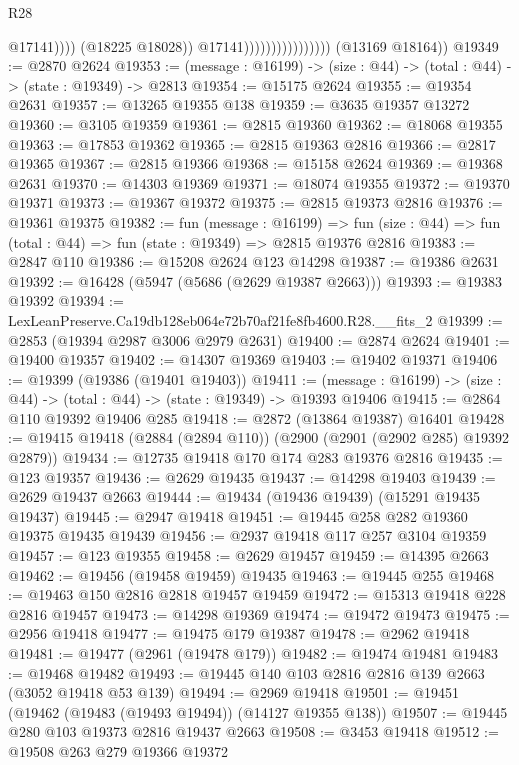 \begin{lexlean}{R28}
\begin{coremodule}
                                                @17141))))
                                        (@18225 @18028))
                                      @17141))))))))))))))))
      (@13169 @18164))
@19349 := @2870 @2624
@19353 := (message : @16199) -> (size : @44) -> (total : @44) -> (state : @19349) -> @2813
@19354 := @15175 @2624
@19355 := @19354 @2631
@19357 := @13265 @19355 @138
@19359 := @3635 @19357 @13272
@19360 := @3105 @19359
@19361 := @2815 @19360
@19362 := @18068 @19355
@19363 := @17853 @19362
@19365 := @2815 @19363 @2816
@19366 := @2817 @19365
@19367 := @2815 @19366
@19368 := @15158 @2624
@19369 := @19368 @2631
@19370 := @14303 @19369
@19371 := @18074 @19355
@19372 := @19370 @19371
@19373 := @19367 @19372
@19375 := @2815 @19373 @2816
@19376 := @19361 @19375
@19382 := fun (message : @16199) =>
  fun (size : @44) => fun (total : @44) => fun (state : @19349) => @2815 @19376 @2816
@19383 := @2847 @110
@19386 := @15208 @2624 @123 @14298
@19387 := @19386 @2631
@19392 := @16428 (@5947 (@5686 (@2629 @19387 @2663)))
@19393 := @19383 @19392
@19394 := LexLeanPreserve.Ca19db128eb064e72b70af21fe8fb4600.R28.__fits_2
@19399 := @2853 (@19394 @2987 @3006 @2979 @2631)
@19400 := @2874 @2624
@19401 := @19400 @19357
@19402 := @14307 @19369
@19403 := @19402 @19371
@19406 := @19399 (@19386 (@19401 @19403))
@19411 := (message : @16199) -> (size : @44) -> (total : @44) -> (state : @19349) -> @19393 @19406
@19415 := @2864 @110 @19392 @19406 @285
@19418 := @2872 (@13864 @19387) @16401
@19428 := @19415 @19418 (@2884 (@2894 @110)) (@2900 (@2901 (@2902 @285) @19392 @2879))
@19434 := @12735 @19418 @170 @174 @283 @19376 @2816
@19435 := @123 @19357
@19436 := @2629 @19435
@19437 := @14298 @19403
@19439 := @2629 @19437 @2663
@19444 := @19434 (@19436 @19439) (@15291 @19435 @19437)
@19445 := @2947 @19418
@19451 := @19445 @258 @282 @19360 @19375 @19435 @19439
@19456 := @2937 @19418 @117 @257 @3104 @19359
@19457 := @123 @19355
@19458 := @2629 @19457
@19459 := @14395 @2663
@19462 := @19456 (@19458 @19459) @19435
@19463 := @19445 @255
@19468 := @19463 @150 @2816 @2818 @19457 @19459
@19472 := @15313 @19418 @228 @2816 @19457
@19473 := @14298 @19369
@19474 := @19472 @19473
@19475 := @2956 @19418
@19477 := @19475 @179 @19387
@19478 := @2962 @19418
@19481 := @19477 (@2961 (@19478 @179))
@19482 := @19474 @19481
@19483 := @19468 @19482
@19493 := @19445 @140 @103 @2816 @2816 @139 @2663 (@3052 @19418 @53 @139)
@19494 := @2969 @19418
@19501 := @19451 (@19462 (@19483 (@19493 @19494)) (@14127 @19355 @138))
@19507 := @19445 @280 @103 @19373 @2816 @19437 @2663
@19508 := @3453 @19418
@19512 := @19508 @263 @279 @19366 @19372

\end{coremodule}
\end{lexlean}
